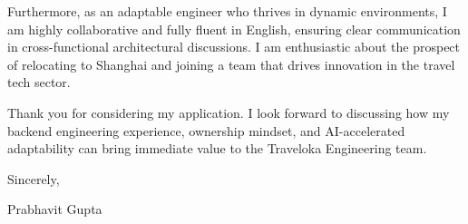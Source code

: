 \documentclass[11pt,a4paper]{article}
\begin{document}
\noindent
Furthermore, as an adaptable engineer who thrives in dynamic environments, I am highly collaborative and fully fluent in English, ensuring clear communication in cross-functional architectural discussions. I am enthusiastic about the prospect of relocating to Shanghai and joining a team that drives innovation in the travel tech sector.

\noindent
Thank you for considering my application. I look forward to discussing how my backend engineering experience, ownership mindset, and AI-accelerated adaptability can bring immediate value to the Traveloka Engineering team.

\vspace{5mm}

\noindent
Sincerely,

\vspace{3mm}

\noindent
Prabhavit Gupta
\end{document}
